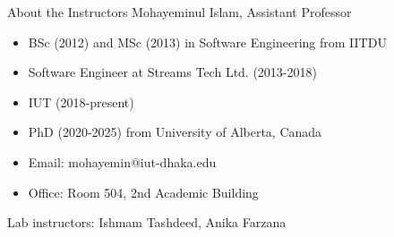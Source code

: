 \begin{frame}{About the Instructors}
    Mohayeminul Islam, Assistant Professor
    \small
    \begin{itemize}
        \item BSc (2012) and MSc (2013) in Software Engineering from IITDU
        \item Software Engineer at Streams Tech Ltd. (2013-2018)
        \item IUT (2018-present)
        \item PhD (2020-2025) from University of Alberta, Canada        
        \item Email: mohayemin@iut-dhaka.edu
        \item Office: Room 504, 2nd Academic Building
    \end{itemize}

    Lab instructors: Ishmam Tashdeed, Anika Farzana
\end{frame}